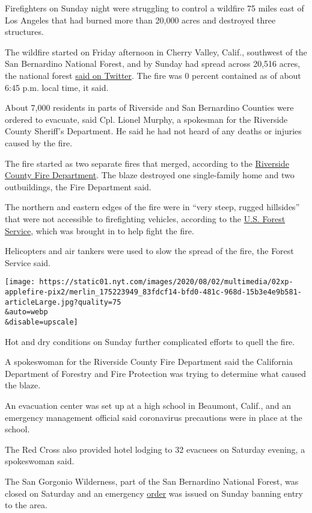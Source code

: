 Firefighters on Sunday night were struggling to control a wildfire 75
miles east of Los Angeles that had burned more than 20,000 acres and
destroyed three structures.

The wildfire started on Friday afternoon in Cherry Valley, Calif.,
southwest of the San Bernardino National Forest, and by Sunday had
spread across 20,516 acres, the national forest
\href{https://twitter.com/SanBernardinoNF/status/1289968204933029888?s=20}{said
on Twitter}. The fire was 0 percent contained as of about 6:45 p.m.
local time, it said.

About 7,000 residents in parts of Riverside and San Bernardino Counties
were ordered to evacuate, said Cpl. Lionel Murphy, a spokesman for the
Riverside County Sheriff's Department. He said he had not heard of any
deaths or injuries caused by the fire.

The fire started as two separate fires that merged, according to the
\href{http://www.rvcfire.org/_Layouts/Incident\%20Information/IncidentInfoDetail.aspx?4558}{Riverside
County Fire Department}. The blaze destroyed one single-family home and
two outbuildings, the Fire Department said.

The northern and eastern edges of the fire were in ``very steep, rugged
hillsides'' that were not accessible to firefighting vehicles, according
to the \href{https://inciweb.nwcg.gov/incident/6902/}{U.S. Forest
Service}, which was brought in to help fight the fire.

Helicopters and air tankers were used to slow the spread of the fire,
the Forest Service said.

\texttt{[image: https://static01.nyt.com/images/2020/08/02/multimedia/02xp-applefire-pix2/merlin\_175223949\_83fdcf14-bfd0-481c-968d-15b3e4e9b581-articleLarge.jpg?quality=75\\\&auto=webp\\\&disable=upscale]}

Hot and dry conditions on Sunday further complicated efforts to quell
the fire.

A spokeswoman for the Riverside County Fire Department said the
California Department of Forestry and Fire Protection was trying to
determine what caused the blaze.

An evacuation center was set up at a high school in Beaumont, Calif.,
and an emergency management official said coronavirus precautions were
in place at the school.

The Red Cross also provided hotel lodging to 32 evacuees on Saturday
evening, a spokeswoman said.

The San Gorgonio Wilderness, part of the San Bernardino National Forest,
was closed on Saturday and an emergency
\href{https://inciweb.nwcg.gov/photos/CABDF/2020-08-01-1443-Apple-fire/related_files/pict20200702-002517-0.pdf}{order}
was issued on Sunday banning entry to the area.

